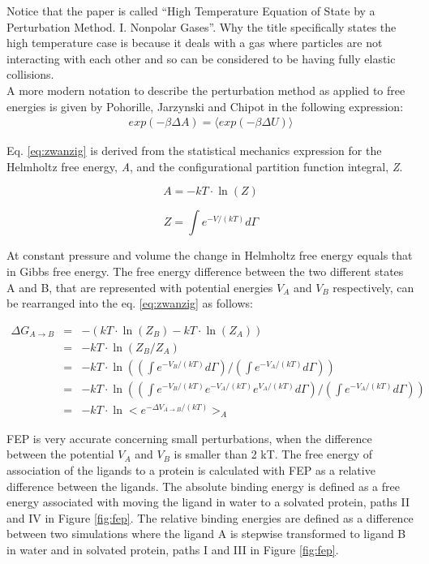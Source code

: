 \documentclass[10pt,oneside,pdftex]{article}
\begin{document}
Notice that the  paper is called ``High Temperature  Equation of State
by  a  Perturbation  Method.  I.   Nonpolar  Gases''.  Why  the  title
specifically states the high temperature case is because it deals with
a gas where  particles are not interacting with each  other and so can
be considered to be having fully elastic collisions.\\

A more modern notation to  describe the perturbation method as applied
to   free   energies   is    given   by   Pohorille,   Jarzynski   and
Chipot\cite{pohorille2010} in the following expression:
\begin{gather}
exp(-\beta\Delta A)= \langle exp(-\beta\Delta U) \rangle
\end{gather}

\noindent  Eq.   \ref{eq:zwanzig}  is  derived  from   the  statistical
mechanics expression for the Helmholtz free energy, \textit{A}, and the
configurational partition function integral, \textit {Z}.

\begin{equation}
\label{eq:s.m.h.}
  A=-kT \cdot \ln(Z)
\end{equation}

\begin{equation}
\label{eq:conf}
  Z=\int e^{-V/(kT)} d \Gamma
\end{equation}

\noindent At constant pressure and volume the change in Helmholtz free
energy equals  that in Gibbs  free energy. The free  energy difference
between the  two different states A  and B, that are  represented with
potential  energies $V_A$  and $V_B$  respectively, can  be rearranged
into the eq.  \ref{eq:zwanzig} as follows:


\begin{eqnarray}
  \nonumber \Delta G_{A \rightarrow B}&=&-(kT \cdot \ln(Z_B)-kT \cdot \ln(Z_A))\\
  \nonumber &=& -kT \cdot \ln(Z_B/Z_A)\\
             &=& -kT \cdot \ln((\int e^{-V_B/(kT)} d \Gamma)/(\int e^{-V_A/(kT)} d \Gamma))\\
  \nonumber &=& -kT \cdot \ln((\int e^{-V_B/(kT)}e^{-V_A/(kT)}e^{V_A/(kT)} d \Gamma)/(\int e^{-V_A/(kT)} d \Gamma))\\
  \nonumber &=& -kT \cdot \ln<e^{-\Delta V_{A \rightarrow B}/(kT)}>_A
\end{eqnarray}

FEP  is  very  accurate   concerning  small  perturbations,  when  the
difference  between the  potential  $V_A$ and  $V_B$  is smaller  than
2 kT. The  free energy of  association of the  ligands to a  protein is
calculated with FEP as a relative difference between the ligands.  The
absolute binding  energy is defined  as a free energy  associated with
moving the ligand in  water to a solvated protein, paths  II and IV in
Figure \ref{fig:fep}. The  relative binding energies are  defined as a
difference  between two  simulations where  the ligand  A is  stepwise
transformed to ligand B in water  and in solvated protein, paths I and
III in Figure \ref{fig:fep}.
\end{document}
